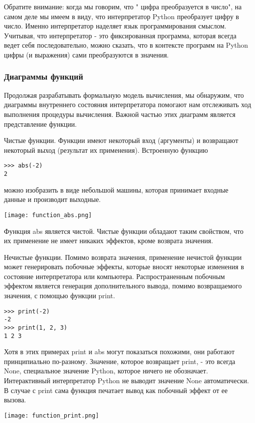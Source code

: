 Обратите внимание: когда мы говорим, что " цифра преобразуется в число", на самом деле мы имеем в виду, что интерпретатор Python преобразует цифру в число. Именно интерпретатор наделяет язык программирования смыслом. Учитывая, что интерпретатор - это фиксированная программа, которая всегда ведет себя последовательно, можно сказать, что в контексте программ на Python цифры (и выражения) сами преобразуются в значения.

\subsubsection{Диаграммы функций}
Продолжая разрабатывать формальную модель вычисления, мы обнаружим, что диаграммы внутреннего состояния интерпретатора помогают нам отслеживать ход выполнения процедуры вычисления. Важной частью этих диаграмм является представление функции.

Чистые функции. Функции имеют некоторый вход (аргументы) и возвращают некоторый выход (результат их применения). Встроенную функцию
\begin{verbatim}
>>> abs(-2)
2
\end{verbatim}

можно изобразить в виде небольшой машины, которая принимает входные данные и производит выходные.
\begin{center}
  \texttt{[image: function\_abs.png]}
\end{center}

Функция abs является чистой. Чистые функции обладают таким свойством, что их применение не имеет никаких эффектов, кроме возврата значения.

Нечистые функции. Помимо возврата значения, применение нечистой функции может генерировать побочные эффекты, которые вносят некоторые изменения в состояние интерпретатора или компьютера. Распространенным побочным эффектом является генерация дополнительного вывода, помимо возвращаемого значения, с помощью функции print.
\begin{verbatim}
>>> print(-2)
-2
>>> print(1, 2, 3)
1 2 3
\end{verbatim}

Хотя в этих примерах print и abs могут показаться похожими, они работают принципиально по-разному. Значение, которое возвращает print, - это всегда None, специальное значение Python, которое ничего не обозначает. Интерактивный интерпретатор Python не выводит значение None автоматически. В случае с print сама функция печатает вывод как побочный эффект от ее вызова.
\begin{center}
  \texttt{[image: function\_print.png]}
\end{center}

